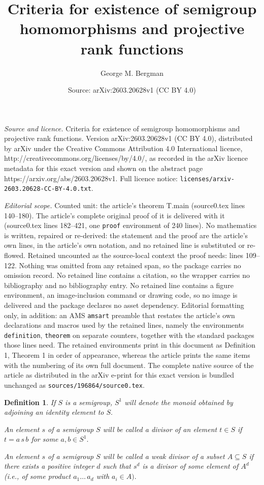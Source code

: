\documentclass[10pt,a4paper]{amsart}
\title{Criteria for existence of semigroup homomorphisms and projective rank functions}
\author{George M. Bergman}
\date{Source: arXiv:2603.20628v1 (CC BY 4.0)}
\newtheorem{definition}{Definition}
\begin{document}
\maketitle

\noindent\emph{Source and licence.} Criteria for existence of semigroup homomorphisms and projective rank functions. Version arXiv:2603.20628v1 (CC BY 4.0), distributed by arXiv under the Creative Commons Attribution 4.0 International licence, http://creativecommons.org/licenses/by/4.0/, as recorded in the arXiv licence metadata for this exact version and shown on the abstract page https://arxiv.org/abs/2603.20628v1. Full licence notice: \texttt{licenses/arxiv-2603.20628-CC-BY-4.0.txt}.\par\smallskip

\noindent\textit{Editorial scope.} Counted unit: the article's theorem T.main (source0.tex lines 140--180). The article's complete original proof of it is delivered with it (source0.tex lines 182--421, one \texttt{proof} environment of 240 lines). No mathematics is written, repaired or re-derived: the statement and the proof are the article's own lines, in the article's own notation, and no retained line is substituted or re-flowed.  Retained uncounted as the source-local context the proof needs: lines 109--122.  Nothing was omitted from any retained span, so the package carries no omission record.  No retained line contains a citation, so the wrapper carries no bibliography and no bibliography entry.  No retained line contains a figure environment, an image-inclusion command or drawing code, so no image is delivered and the package declares no asset dependency.  Editorial formatting only, in addition: an AMS \texttt{amsart} preamble that restates the article's own declarations and macros used by the retained lines, namely the environments \texttt{definition}, \texttt{theorem} on separate counters, together with the standard packages those lines need.  The retained environments print in this document as Definition 1, Theorem 1 in order of appearance, whereas the article prints the same items with the numbering of its own full document.  The complete native source of the article as distributed in the arXiv e-print for this exact version is bundled unchanged as \texttt{sources/196864/source0.tex}.
\begin{definition}\label{D.divisor}
If $S$ is a semigroup, $S^1$ will denote the
monoid obtained by adjoining an identity element to $S.$

An element $s$ of a semigroup $S$ will be called
a {\em divisor} of an element $t\in S$
if $t = a\,s\,b$ for some $a, b\in S^1.$

An element $s$ of a semigroup $S$ will be called
a {\em weak divisor} of a
subset $A\subseteq S$ if there exists a positive
integer $d$ such that $s^d$ is a divisor of some element
of $A^d$ {\rm(}i.e., of some product $a_1\dots\,a_d$ with $a_i\in A).$
\end{definition}
\end{document}
